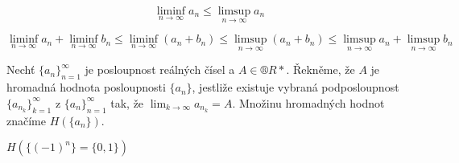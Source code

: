 \documentclass[12pt]{article}					%
\begin{document}
        \begin{priklad}
            $$\liminf\limits_{n \rightarrow ∞} a_n ≤ \limsup\limits_{n \rightarrow ∞} a_n$$

            $$ \liminf\limits_{n \rightarrow ∞} a_n + \liminf\limits_{n \rightarrow ∞} b_n ≤ \liminf\limits_{n \rightarrow ∞} (a_n + b_n) ≤ \limsup\limits_{n \rightarrow ∞} (a_n + b_n) ≤ \limsup\limits_{n \rightarrow ∞} a_n + \limsup\limits_{n \rightarrow ∞} b_n $$
        \end{priklad}

        \begin{definice}
            Nechť $\{a_n\}_{n = 1}^∞$ je posloupnost reálných čísel a $A \in ®R*$. Řekněme, že $A$ je hromadná hodnota posloupnosti $\{a_n\}$, jestliže existuje vybraná podposloupnost $\{a_{n_k}\}_{k = 1}^∞$ z $\{a_n\}_{n = 1}^∞$ tak, že $\lim_{k \rightarrow ∞} a_{n_k} = A$. Množinu hromadných hodnot značíme $H(\{a_n\})$.

            \begin{prikladyin}
                $H(\{(-1)^n\} = \{0, 1\})$
            \end{prikladyin}
        \end{definice}
\end{document}
